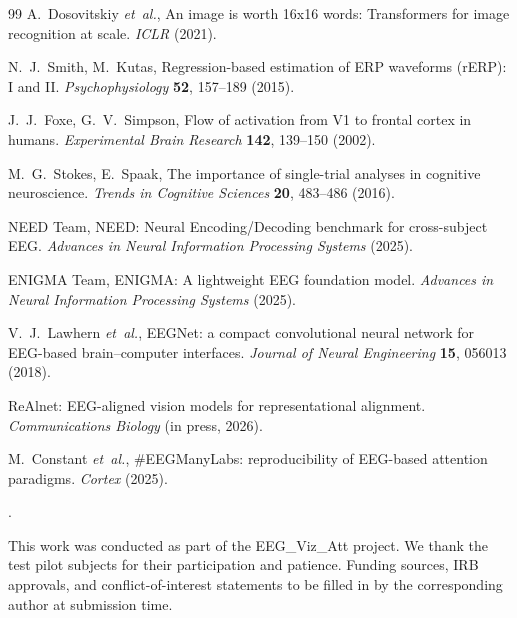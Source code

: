\documentclass[12pt]{article}
\newcounter{lastnote}
\newenvironment{scilastnote}{%
\setcounter{lastnote}{\value{enumiv}}%
\addtocounter{lastnote}{+1}%
\begin{list}{\arabic{lastnote}.}{\setlength{\leftmargin}{.22in}}{\setlength{\labelsep}{.5em}}}{\end{list}}
\begin{document}
\begin{thebibliography}{99}
A.~Dosovitskiy \textit{et~al.}, An image is worth 16x16 words: Transformers
for image recognition at scale. \textit{ICLR} (2021).

N.~J.~Smith, M.~Kutas, Regression-based estimation of {ERP} waveforms
({rERP}): I and II. \textit{Psychophysiology} \textbf{52}, 157--189 (2015).

J.~J.~Foxe, G.~V.~Simpson, Flow of activation from {V1} to frontal cortex
in humans. \textit{Experimental Brain Research} \textbf{142}, 139--150 (2002).

M.~G.~Stokes, E.~Spaak, The importance of single-trial analyses in
cognitive neuroscience. \textit{Trends in Cognitive Sciences} \textbf{20},
483--486 (2016).

{NEED Team}, {NEED}: Neural Encoding/Decoding benchmark for cross-subject
{EEG}. \textit{Advances in Neural Information Processing Systems} (2025).

{ENIGMA Team}, {ENIGMA}: A lightweight {EEG} foundation model.
\textit{Advances in Neural Information Processing Systems} (2025).

V.~J.~Lawhern \textit{et~al.}, {EEGNet}: a compact convolutional neural
network for {EEG}-based brain--computer interfaces. \textit{Journal of
Neural Engineering} \textbf{15}, 056013 (2018).

{ReAlnet}: {EEG}-aligned vision models for representational alignment.
\textit{Communications Biology} (in press, 2026).

M.~Constant \textit{et~al.}, \#{EEGManyLabs}: reproducibility of
{EEG}-based attention paradigms. \textit{Cortex} (2025).

\end{thebibliography}

\begin{scilastnote}
\item This work was conducted as part of the EEG\_Viz\_Att
project. We thank the test pilot subjects for their participation
and patience.  Funding sources, IRB approvals, and conflict-of-interest
statements to be filled in by the corresponding author at submission
time.
\end{scilastnote}

\clearpage
\end{document}
